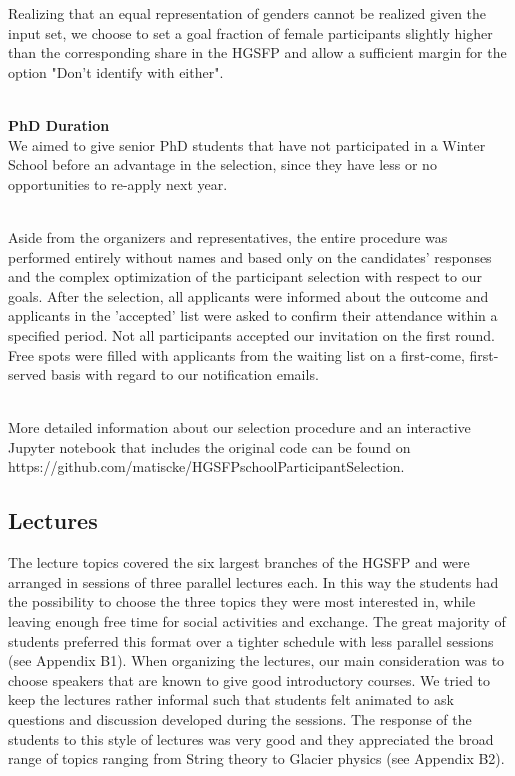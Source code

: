 Realizing that an equal representation of genders cannot be realized given the input set, we choose to set a goal fraction of female participants slightly higher than the corresponding share in the HGSFP and allow a sufficient margin for the option "Don't identify with either".

~\\
\textbf{PhD Duration}\\
We aimed to give senior PhD students that have not participated in a Winter School before an advantage in the selection, since they have less or no opportunities to re-apply next year.

~\\
Aside from the organizers and representatives, the entire procedure was performed entirely without names and based only on the candidates' responses and the complex optimization of the participant selection with respect to our goals. After the selection, all applicants were informed about the outcome and applicants in the 'accepted' list were asked to confirm their attendance within a specified period. Not all participants accepted our invitation on the first round. Free spots were filled with applicants from the waiting list on a first-come, first-served basis with regard to our notification emails. 

~\\
More detailed information about our selection procedure and an interactive Jupyter notebook that includes the original code can be found on\\
https://github.com/matiscke/HGSFPschoolParticipantSelection.








\subsection*{Lectures}
The lecture topics covered the six largest branches of the HGSFP and were
arranged in sessions of three parallel lectures each. In this way the
students had the possibility to choose the three topics they were most
interested in, while leaving enough free time for social activities and
exchange. The great majority of students preferred this format over a
tighter schedule with less parallel sessions (see Appendix B1). When
organizing the lectures, our main consideration was to choose
speakers that are known to give good introductory courses. We tried to
keep the lectures rather informal such that students felt animated to
ask questions and discussion developed during the sessions. The response
of the students to this style of lectures was very good and they
appreciated the broad range of topics ranging from String theory to Glacier
physics (see Appendix B2).

